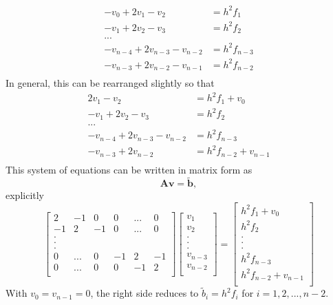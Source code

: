 \documentclass[reprint, english,notitlepage]{revtex4-1}  %
\begin{document}
\begin{align*}
  - v_0 + 2 v_1 - v_2 &= h^2 f_1 \\
  - v_1 + 2 v_2 - v_3 &= h^2 f_2 \\
  ... \\
  - v_{n-4} + 2 v_{n-3} - v_{n-2} &= h^2 f_{n-3} \\
  - v_{n-3} + 2 v_{n-2} - v_{n-1} &= h^2 f_{n-2} \\
\end{align*}
In general, this can be rearranged slightly so that
\begin{align*}
  2 v_1 - v_2 &= h^2 f_1 + v_0\\
  - v_1 + 2 v_2 - v_3 &= h^2 f_2 \\
  ... \\
  - v_{n-4} + 2 v_{n-3} - v_{n-2} &= h^2 f_{n-3} \\
  - v_{n-3} + 2 v_{n-2} &= h^2 f_{n-2} + v_{n-1} \\
\end{align*}
This system of equations can be written in matrix form as
\begin{equation}
  \label{eq:Poisson_1D_matrix}
  \boldsymbol A \boldsymbol v = \boldsymbol{\tilde{b}},
\end{equation}
explicitly
\begin{equation*}{}
  \begin{bmatrix}
2  & -1 & 0  & 0 & ... & 0 \\
-1 & 2  & -1 & 0 & ... & 0 \\
.  &    &    &   &     & \\
.  &    &    &   &     & \\
.  &    &    &   &     & \\
0  & ...& 0  &-1 & 2   & -1  \\
0  & ...& 0  & 0 &-1 & 2  \\
\end{bmatrix}
  \begin{bmatrix}
 v_1  \\
 v_2  \\
.   \\
.   \\
.   \\
 v_{n-3} \\
v_{n-2} \\
\end{bmatrix}
=
\begin{bmatrix}
h^2 f_1 + v_0 \\
h^2 f_2  \\
.   \\
.   \\
.   \\
h^2 f_{n-3} \\
h^2 f_{n-2} + v_{n-1}\\
\end{bmatrix}
\end{equation*}
With $v_0 = v_{n-1} = 0$, the right side reduces to $\tilde b_i = h^2 f_i$ for $i = 1, 2, ..., n-2$.
\end{document}
